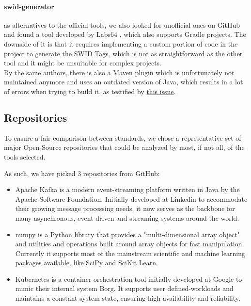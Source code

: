 \paragraph{swid-generator} as alternatives to the official tools, we also looked for unofficial ones on GitHub and found a tool developed by Labs64 \cite{repo:swid-generator}, which also supports Gradle projects. The downside of it is that it requires implementing a custom portion of code in the project to generate the SWID Tags, which is not as straightforward as the other tool and it might be unsuitable for complex projects. 
\\ By the same authors, there is also a Maven plugin which is unfortunately not maintained anymore and uses an outdated version of Java, which results in a lot of errors when trying to build it, as testified by \href{https://github.com/Labs64/swid-maven-plugin/issues/5}{this issue}.






\subsection{Repositories} \label{methodology:repositories}

To ensure a fair comparison between standards, we chose a representative set of major Open-Source repositories that could be analyzed by most, if not all, of the tools selected.

As such, we have picked 3 repositories from GitHub:

\begin{itemize}
    \item Apache Kafka \cite{repository:dataset:kafka} is a modern event-streaming platform written in Java by the Apache Software Foundation. Initially developed at Linkedin to accommodate their growing message processing needs, it now serves as the backbone for many asynchronous, event-driven and streaming systems around the world.
    \item numpy \cite{repository:dataset:numpy} is a Python library that provides a "multi-dimensional array object" and utilities and operations built around array objects for fast manipulation. Currently it supports most of the mainstream scientific and machine learning packages available, like SciPy and SciKit Learn.
    \item Kubernetes \cite{repository:dataset:k8s} is a container orchestration tool initially developed at Google to mimic their internal system Borg. It supports user defined-workloads and maintains a constant system state, ensuring high-availability and reliability.
\end{itemize}